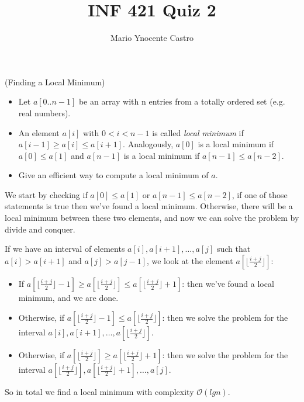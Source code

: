 \documentclass[10pt,a4paper,oneside]{article}
\newenvironment{exercice}[1][Exercice]{\begin{trivlist}
\item[\hskip \labelsep {\bfseries #1}]}{\end{trivlist}}
\newenvironment{solution}[1][Solution]{\begin{trivlist}
\item[\hskip \labelsep {\bfseries #1}]}{\end{trivlist}}
\begin{document}
\title{INF 421 Quiz 2}
\author{Mario Ynocente Castro}

\maketitle

\begin{exercice} (Finding a Local Minimum)

\begin{itemize}
\item
Let $a[0..n-1]$ be an array with n entries from a totally ordered set (e.g. real numbers).

\item
An element $a[i]$ with $0 < i < n - 1$ is called \textit{local minimum} if $a[i - 1] \geq a[i] \leq a[i + 1]$. Analogously, $a[0]$ is a local minimum if $a[0] \leq a[1]$ and $a[n - 1]$ is a local minimum if $a[n - 1] \leq a[n - 2]$.

\item
Give an efficient way to compute a local minimum of $a$.
\end{itemize}

\end{exercice}


\begin{solution}

We start by checking if $a[0] \leq a[1]$ or $a[n - 1] \leq a[n - 2]$, if one of those statements is true then we've found a local minimum. Otherwise, there will be a local minimum between these two elements, and now we can solve the problem by divide and conquer.

If we have an interval of elements $a[i], a[i + 1], \ldots, a[j]$ such that $a[i] > a[i + 1]$ and $a[j] > a[j - 1]$, we look at the element $a[ \lfloor \frac{i + j}{2} \rfloor ]$:

\begin{itemize}
\item
If $a[ \lfloor \frac{i + j}{2} \rfloor - 1 ] \geq a[ \lfloor \frac{i + j}{2} \rfloor ] \leq a[ \lfloor \frac{i + j}{2} \rfloor + 1 ]$: then we've found a local minimum, and we are done.

\item
Otherwise, if $a[ \lfloor \frac{i + j}{2} \rfloor - 1 ] \leq a[ \lfloor \frac{i + j}{2} \rfloor ]$: then we solve the problem for the interval $a[i], a[i + 1], \ldots, a[ \lfloor \frac{i + j}{2} \rfloor ]$.

\item
Otherwise, if $a[ \lfloor \frac{i + j}{2} \rfloor ] \geq a[ \lfloor \frac{i + j}{2} \rfloor + 1 ]$: then we solve the problem for the interval $a[ \lfloor \frac{i + j}{2} \rfloor ], a[ \lfloor \frac{i + j}{2} \rfloor + 1 ], \ldots, a[j]$.
\end{itemize}

So in total we find a local minimum with complexity $\mathcal{O}(lg n)$.

\end{solution}
\end{document}
